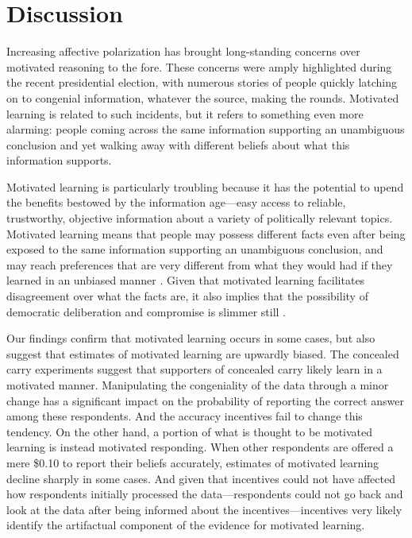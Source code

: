 \documentclass[12pt, letterpaper]{article}
\begin{document}
\section*{Discussion}

Increasing affective polarization \citep[see, e.g.,][]{iyengar2012affect, iyengar2014fear} has brought long-standing concerns over motivated reasoning to the fore. These concerns were amply highlighted during the recent presidential election, with numerous stories of people quickly latching on to congenial information, whatever the source, making the rounds. Motivated learning is related to such incidents, but it refers to something even more alarming: people coming across the same information supporting an unambiguous conclusion and yet walking away with different beliefs about what this information supports.

Motivated learning is particularly troubling because it has the potential to upend the benefits bestowed by the information age---easy access to reliable, trustworthy, objective information about a variety of politically relevant topics. Motivated learning means that people may possess different facts even after being exposed to the same information supporting an unambiguous conclusion, and may reach preferences that are very different from what they would had if they learned in an unbiased manner \citep{gilens2001, hochschild2001}. Given that motivated learning facilitates disagreement over what the facts are, it also implies that the possibility of democratic deliberation and compromise is slimmer still \citep{shapiro2008, muirhead2013}.

Our findings confirm that motivated learning occurs in some cases, but also suggest that estimates of motivated learning are upwardly biased. The concealed carry experiments suggest that supporters of concealed carry likely learn in a motivated manner. Manipulating the congeniality of the data through a minor change has a significant impact on the probability of reporting the correct answer among these respondents. And the accuracy incentives fail to change this tendency. 
On the other hand, a portion of what is thought to be motivated learning is instead motivated responding. When other respondents are offered a mere \$0.10 to report their beliefs accurately, estimates of motivated learning decline sharply in some cases. And given that incentives could not have affected how respondents initially processed the data---respondents could not go back and look at the data after being informed about the incentives---incentives very likely identify the artifactual component of the evidence for motivated learning. 
\end{document}
